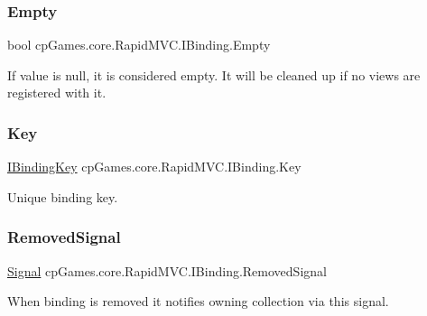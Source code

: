 \subsubsection{\texorpdfstring{Empty}{Empty}}
{\footnotesize\ttfamily bool cp\+Games.\+core.\+Rapid\+M\+V\+C.\+I\+Binding.\+Empty\hspace{0.3cm}{\ttfamily [get]}}



If value is null, it is considered empty. It will be cleaned up if no views are registered with it. 

\mbox{\label{interfacecp_games_1_1core_1_1_rapid_m_v_c_1_1_i_binding_aa61ee9cd1b44e221f1ae28f9552792c7}} 
\subsubsection{\texorpdfstring{Key}{Key}}
{\footnotesize\ttfamily \mbox{\hyperlink{interfacecp_games_1_1core_1_1_rapid_m_v_c_1_1_i_binding_key}{I\+Binding\+Key}} cp\+Games.\+core.\+Rapid\+M\+V\+C.\+I\+Binding.\+Key\hspace{0.3cm}{\ttfamily [get]}}



Unique binding key. 

\mbox{\label{interfacecp_games_1_1core_1_1_rapid_m_v_c_1_1_i_binding_afc250797ed507d05b9b611f4d63cd345}} 
\subsubsection{\texorpdfstring{RemovedSignal}{RemovedSignal}}
{\footnotesize\ttfamily \mbox{\hyperlink{classcp_games_1_1core_1_1_rapid_m_v_c_1_1_signal}{Signal}} cp\+Games.\+core.\+Rapid\+M\+V\+C.\+I\+Binding.\+Removed\+Signal\hspace{0.3cm}{\ttfamily [get]}}



When binding is removed it notifies owning collection via this signal. 

